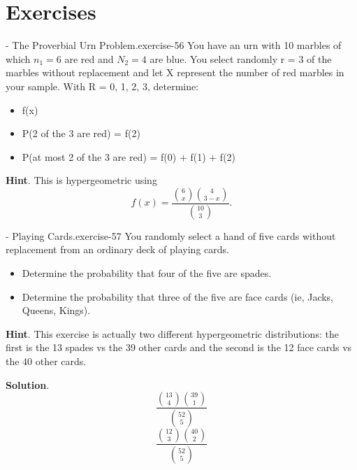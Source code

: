 \documentclass[10pt,]{book}
\numberwithin{equation}{section}
\begin{document}
\section[{Exercises}]{Exercises}\label{section-44}
\hypertarget{p-864}{}%
\begin{inlineexercise}{- The Proverbial Urn Problem.}{exercise-56}%
\hypertarget{p-865}{}%
You have an urn with 10 marbles of which \(n_1 = 6\) are red and \(N_2 = 4\) are blue. You select randomly r = 3 of the marbles without replacement and let X represent the number of red marbles in your sample. With R = {0, 1, 2, 3}, determine: \leavevmode%
\begin{itemize}[label=\textbullet]
\item{}f(x)%
\item{}P(2 of the 3 are red) = f(2)%
\item{}P(at most 2 of the 3 are red) = f(0) + f(1) + f(2)%
\end{itemize}
%
\par\smallskip%
\noindent\textbf{Hint}.\hypertarget{hint-3}{}\quad%
\hypertarget{p-866}{}%
This is hypergeometric using%
\begin{equation*}
f(x) = \frac{\binom{6}{x} \binom{4}{3-x}}{\binom{10}{3}}.
\end{equation*}
%
\end{inlineexercise}
%
\par
\hypertarget{p-867}{}%
\begin{inlineexercise}{- Playing Cards.}{exercise-57}%
\hypertarget{p-868}{}%
You randomly select a hand of five cards without replacement from an ordinary deck of playing cards. \leavevmode%
\begin{itemize}[label=\textbullet]
\item{}Determine the probability that four of the five are spades.%
\item{}Determine the probability that three of the five are face cards (ie, Jacks, Queens, Kings).%
\end{itemize}
%
\par\smallskip%
\noindent\textbf{Hint}.\hypertarget{hint-4}{}\quad%
\hypertarget{p-869}{}%
This exercise is actually two different hypergeometric distributions: the first is the 13 spades vs the 39 other cards and the second is the 12 face cards vs the 40 other cards.%
\par\smallskip%
\noindent\textbf{Solution}.\hypertarget{solution-25}{}\quad%
\hypertarget{p-870}{}%
%
\begin{equation*}
\frac{\binom{13}{4} \binom{39}{1}}{\binom{52}{5}}
\end{equation*}
%
\begin{equation*}
\frac{\binom{12}{3} \binom{40}{2}}{\binom{52}{5}}
\end{equation*}
%
\end{inlineexercise}
\end{document}
